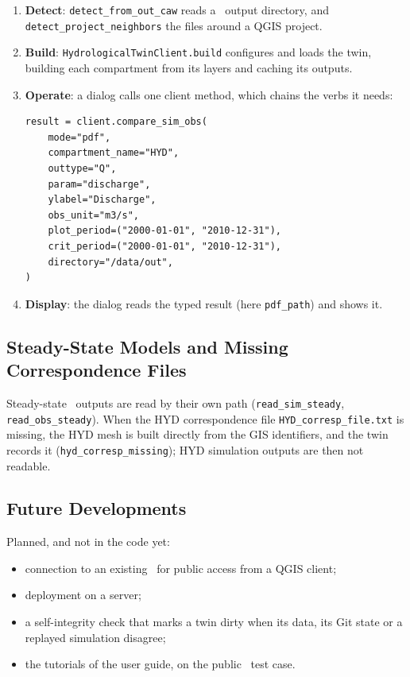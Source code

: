 \begin{enumerate}
    \item \textbf{Detect}: \texttt{detect\_from\_out\_caw} reads a \cw\ output directory, and \texttt{detect\_project\_neighbors} the files around a QGIS project.
    \item \textbf{Build}: \texttt{HydrologicalTwinClient.build} configures and loads the twin, building each compartment from its layers and caching its outputs.
    \item \textbf{Operate}: a dialog calls one client method, which chains the verbs it needs:
    \begin{verbatim}
result = client.compare_sim_obs(
    mode="pdf",
    compartment_name="HYD",
    outtype="Q",
    param="discharge",
    ylabel="Discharge",
    obs_unit="m3/s",
    plot_period=("2000-01-01", "2010-12-31"),
    crit_period=("2000-01-01", "2010-12-31"),
    directory="/data/out",
)
    \end{verbatim}
    \item \textbf{Display}: the dialog reads the typed result (here \texttt{pdf\_path}) and shows it.
\end{enumerate}

\subsection{Steady-State Models and Missing Correspondence Files}

Steady-state \cw\ outputs are read by their own path
(\texttt{read\_sim\_steady}, \texttt{read\_obs\_steady}). When the HYD
correspondence file \texttt{HYD\_corresp\_file.txt} is missing, the HYD mesh
is built directly from the GIS identifiers, and the twin records it
(\texttt{hyd\_corresp\_missing}); HYD simulation outputs are then not readable.

\subsection{Future Developments}

Planned, and not in the code yet:

\begin{itemize}
    \item connection to an existing \hydrot\ for public access from a QGIS client;
    \item deployment on a server;
    \item a self-integrity check that marks a twin dirty when its data, its Git state or a replayed simulation disagree;
    \item the tutorials of the user guide, on the public \cw\ test case.
\end{itemize}

